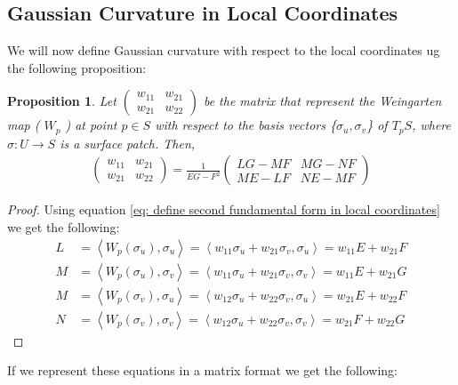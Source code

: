 \documentclass{article}
\theoremstyle{plain}
\newtheorem{proposition}{Proposition}
\theoremstyle{definition}
\theoremstyle{remark}
\begin{document}
\subsection{Gaussian Curvature in Local Coordinates}
We will now define Gaussian curvature with respect to the local coordinates ug the following proposition:
\begin{proposition}
    Let \( \begin{pmatrix}
        w_{11} & w_{21} \\
        w_{21} & w_{22}
    \end{pmatrix}\)
    be the matrix that represent the Weingarten map ( \(W_p\) ) at point \( p \in S\) with respect to the basis vectors \{\( \sigma_u, \sigma_v \)\} of \( T_pS \), where \( \sigma: U \rightarrow S\) is a surface patch. Then,
    \begin{align} \label{eq: Weingarten map local coordinates}
        \begin{pmatrix}
            w_{11} & w_{21} \\
            w_{21} & w_{22}
        \end{pmatrix} = \frac{1}{EG-F^2} \begin{pmatrix}
            LG - MF & MG - NF \\
            ME - LF & NE- MF
        \end{pmatrix}
    \end{align}
\end{proposition}
\begin{proof}
    Using equation \ref{eq: define second fundamental form in local coordinates} we get the following:
    \begin{align*}
        L & = \left\langle W_p(\sigma_u), \sigma_u \right\rangle = \left\langle w_{11}\sigma_u + w_{21}\sigma_v, \sigma_u\right\rangle = w_{11}E + w_{21}F  \\
        M & = \left\langle W_p(\sigma_u), \sigma_v \right\rangle =  \left\langle w_{11}\sigma_u + w_{21}\sigma_v, \sigma_v\right\rangle = w_{11}E + w_{21}G \\
        M & = \left\langle W_p(\sigma_v), \sigma_u \right\rangle = \left\langle w_{12}\sigma_u + w_{22}\sigma_v, \sigma_u\right\rangle = w_{21}E + w_{22}F  \\
        N & = \left\langle W_p(\sigma_v), \sigma_v \right\rangle = \left\langle w_{12}\sigma_u + w_{22}\sigma_v, \sigma_v\right\rangle = w_{21}F + w_{22}G
    \end{align*}
\end{proof}
If we represent these equations in a matrix format we get the following:
\end{document}
